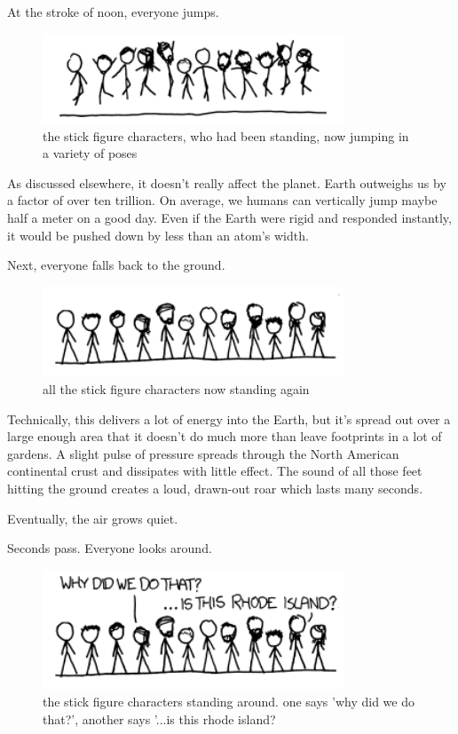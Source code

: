 {At the stroke of noon, everyone jumps.}

\begin{figure}[!htbp]
\centering
\includegraphics[scale=0.5, max width=0.8\textwidth]{imgs/a/8/everybody_jump_jumping.png}
\caption{the stick figure characters, who had been standing, now jumping in a variety of poses}
\end{figure}

{As discussed elsewhere, it doesn’t really affect the planet. Earth outweighs us by a factor of over ten trillion. On average, we humans can vertically jump maybe half a meter on a good day. Even if the Earth were rigid and responded instantly, it would be pushed down by less than an atom’s width.}

{Next, everyone falls back to the ground.}

\begin{figure}[!htbp]
\centering
\includegraphics[scale=0.5, max width=0.8\textwidth]{imgs/a/8/everybody_jump_standing.png}
\caption{all the stick figure characters now standing again}
\end{figure}

{Technically, this delivers a lot of energy into the Earth, but it’s spread out over a large enough area that it doesn’t do much more than leave footprints in a lot of gardens. A slight pulse of pressure spreads through the North American continental crust and dissipates with little effect. The sound of all those feet hitting the ground creates a loud, drawn-out roar which lasts many seconds.}

{Eventually, the air grows quiet.}

{Seconds pass. Everyone looks around.}

\begin{figure}[!htbp]
\centering
\includegraphics[scale=0.5, max width=0.8\textwidth]{imgs/a/8/everybody_jump_talking1.png}
\caption{the stick figure characters standing around. one says 'why did we do that?', another says '...is this rhode island?}
\end{figure}

